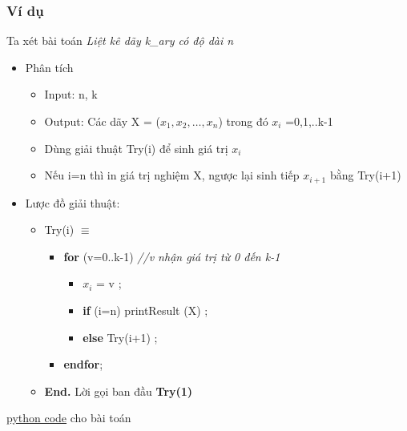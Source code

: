 \subsubsection{Ví dụ}
Ta xét bài toán \textit{Liệt kê dãy k\_ary có độ dài n}
\begin{itemize}
    \item Phân tích
        \begin{itemize}
            \item Input: n, k
            \item Output: Các dãy X = ($x_1, x_2, …,x_n$) trong đó $x_i$ =0,1,..k-1
            \item Dùng giải thuật Try(i) để sinh giá trị $x_i$
            \item Nếu i=n thì in giá trị nghiệm X, ngược lại sinh tiếp $x_{i+1}$ bằng Try(i+1)
        \end{itemize}
    \item Lược đồ giải thuật:
    
    \colorbox{mygrey}{\parbox{14.5cm}{
        \begin{minipage}{14.5cm}
            \begin{itemize}
                \item [] Try(i) $\equiv$
                    \begin{itemize}
                        \item [] \textbf{for} (v=0..k-1) \textit{//v nhận giá trị từ 0 đến k-1}
                            \begin{itemize}
                                \item [] $x_i$ = v ;
                                \item [] \textbf{if} (i=n) printResult (X) ;
                                \item [] \textbf{else} Try(i+1) ;
                            \end{itemize}
                        \item [] \textbf{endfor};
                    \end{itemize}
                \item [] \enskip \textbf{End.} 
                Lời gọi ban đầu \textbf{Try(1)}
            \end{itemize}
        \end{minipage}
        }
    }
\end{itemize}

\href{https://github.com/batman0911/dma_homework/blob/thuyth/hw_01/src/main.ipynb}{python code}
cho bài toán

